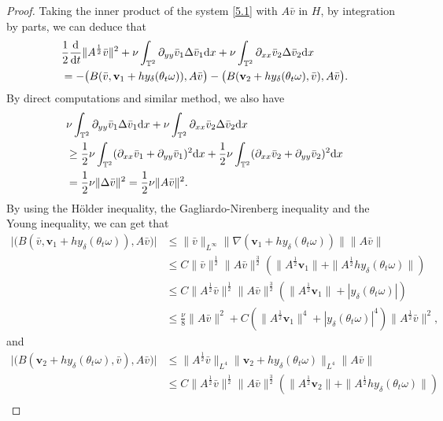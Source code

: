 \documentclass{elsarticle}
\theoremstyle{definition}
\numberwithin{equation}{section}
\renewcommand{\d}{{\rm{d}}}
\begin{document}
\begin{proof}
Taking the inner product of the system   \eqref{5.1} with $A\bar{v}$ in $H$,  by integration by parts, we can deduce that
\begin{align}\label{5.2}
&\frac{1}{2}\frac{\d}{\d t}\|A^\frac12\bar{v}\|^2+ \nu \int_{\mathbb{T}^2}\partial_{yy}\bar{v}_1\Delta \bar{v}_1\d x+\nu \int_{\mathbb{T}^2}\partial_{xx}\bar{v}_2\Delta \bar{v}_2\d x\nonumber\\
&=- \big (B(\bar{v},\textbf{v}_1+hy_\delta(\theta_t\omega)),A\bar{v}\big )
-\big (B(\textbf{v}_2+hy_\delta(\theta_t\omega),\bar{v}),A\bar{v}\big ) .
\end{align}
By direct computations and similar method, we also have
\begin{align}
&\nu \int_{\mathbb{T}^2}\partial_{yy}\bar{v}_1\Delta \bar{v}_1\d x+\nu \int_{\mathbb{T}^2}\partial_{xx}\bar{v}_2\Delta \bar{v}_2\d x\nonumber\\
&\geq \frac12\nu \int_{\mathbb{T}^2}(\partial_{xx}\bar{v}_1+\partial_{yy}\bar{v}_1)^2\d x
+\frac12\nu \int_{\mathbb{T}^2}(\partial_{xx}\bar{v}_2+\partial_{yy}\bar{v}_2)^2\d x
\nonumber\\
&=\frac12\nu\|\Delta \bar{v}\|^2=\frac12\nu\|A \bar{v}\|^2.
\end{align}
By using the H\"{o}lder inequality, the Gagliardo-Nirenberg inequality and the Young inequality, we can get that
\begin{align}\label{5.3}
 \big| \big (B(\bar{v},\textbf{v}_1+hy_\delta(\theta_t\omega)),A\bar{v}\big )\big|
 &\leq \|\bar{v}\|_{L^\infty}\|\nabla(\textbf{v}_1+hy_\delta(\theta_t\omega))\|\|A\bar{v}\|\nonumber\\
&\leq C\|\bar{v}\|^\frac12\|A\bar{v}\|^\frac32
\left (\|A^\frac12\textbf{v}_1\|+\|A^\frac12hy_\delta(\theta_t\omega)\| \right)\nonumber\\
&\leq C\|A^\frac12\bar{v}\|^\frac12\|A\bar{v}\|^\frac32 \left (\|A^\frac12\textbf{v}_1\|+ |y_\delta(\theta_t\omega) | \right)\nonumber\\
&\leq \frac \nu 8\|A\bar{v}\|^2+C \left (\|A^\frac12\textbf{v}_1\|^4+|y_\delta(\theta_t\omega)|^4\right)\|A^\frac12\bar{v}\|^2,
\end{align}
and
\begin{align}\label{5.4}
 \big| \big (B(\textbf{v}_2+hy_\delta(\theta_t\omega),\bar{v}),A\bar{v}\big )\big| &\leq \|A^\frac12\bar{v}\|_{L^4}\|\textbf{v}_2+hy_\delta(\theta_t\omega)\|_{L^4}\|A\bar{v}\|\nonumber\\
&\leq C\|A^\frac12\bar{v}\|^\frac12\|A\bar{v}\|^\frac32 \left(\|A^\frac12\textbf{v}_2\|+\|A^\frac12hy_\delta(\theta_t\omega)\| \right)\nonumber\\

\end{align}
\end{proof}
\end{document}
